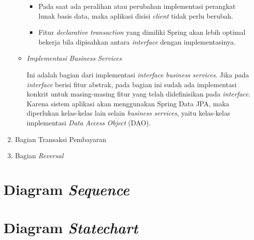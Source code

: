 \begin{enumerate}
\begin{itemize}
\begin{itemize}
      \item Pada saat ada peralihan atau perubahan implementasi perangkat lunak basis data, maka aplikasi disisi \textit{client} tidak perlu berubah.
      
      \item Fitur \textit{declarative transaction} yang dimiliki Spring akan lebih optimal bekerja bila dipisahkan antara \textit{interface} dengan implementasinya.
    \end{itemize}
    
    \item \textit{Implementasi Business Services}
    
    Ini adalah bagian dari implementasi \textit{interface business services}. Jika pada \textit{interface} berisi fitur abstrak, pada bagian ini sudah ada implementasi konkrit untuk masing-masing fitur yang telah didefinisikan pada \textit{interface}. Karena sistem aplikasi akan menggunakan Spring Data JPA, maka diperlukan kelas-kelas lain selain \textit{business services}, yaitu kelas-kelas implementasi \textit{Data Access Object} (DAO).
  \end{itemize}
  
  \item Bagian Transaksi Pembayaran
  \item Bagian \textit{Reversal}
\end{enumerate}

\section{Diagram \textit{Sequence}}

\section{Diagram \textit{Statechart}}

